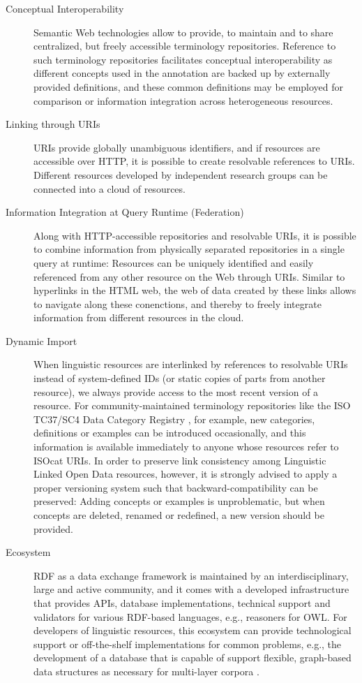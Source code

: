 \begin{description}
\item[Conceptual Interoperability] 
Semantic Web technologies allow to provide, to maintain and to share centralized, but freely accessible terminology repositories. 
Reference to such terminology repositories facilitates conceptual interoperability as different concepts used in the annotation are backed up by externally provided definitions, and these common definitions may be employed for comparison or information integration across heterogeneous resources.

\item[Linking through URIs]
URIs provide globally unambiguous identifiers, and if resources are accessible over HTTP, it is possible to create resolvable references to URIs. Different resources developed by independent research groups can be connected into a cloud of resources.

\item[Information Integration at Query Runtime (Federation)]
Along with HTTP-accessible repositories and resolvable URIs, it is possible to combine information from physically separated  repositories in a single query at runtime: 
Resources can be uniquely identified and easily referenced from any other resource on the Web through URIs. 
Similar to hyperlinks in the HTML web, the web of data created by these links allows to navigate along these conenctions, 
and thereby to freely integrate information from different resources in the cloud.

\item[Dynamic Import]
When linguistic resources are interlinked by references to resolvable URIs instead of system-defined IDs (or static copies of parts from another resource), we always provide access to the most recent version of a resource. 
For community-maintained terminology repositories like the ISO TC37/SC4 Data Category Registry \citep[ISOcat]{wright2004global,windhouwer-wright2012}, for example, new categories, definitions or examples can be introduced occasionally, and this information is available immediately to anyone whose resources refer to ISOcat URIs. 
In order to preserve link consistency among Linguistic Linked Open Data resources, however, it is strongly advised to apply a proper versioning system such that backward-compatibility can be preserved: Adding concepts or examples is unproblematic, but when concepts are deleted, renamed or redefined, a new version should be provided.

\item[Ecosystem]
RDF as a data exchange framework is maintained by an interdisciplinary, large and active community, and it comes with a developed infrastructure that provides APIs, database implementations, technical support and va\-li\-da\-tors for various RDF-based languages, e.g., reasoners for OWL. For developers of linguistic resources, this ecosystem can provide technological support or off-the-shelf implementations for common problems, e.g., the de\-ve\-lop\-ment of a database that is capable of support flexible, graph-based data structures as necessary for multi-layer corpora \citep{ide-suderman07-graf}.
\end{description}


